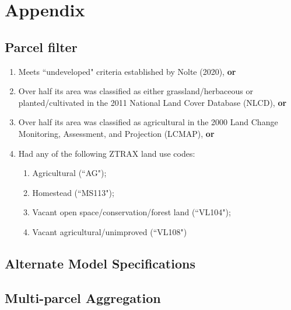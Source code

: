 \documentclass[12pt]{article}
\begin{document}
\newpage

\section{Appendix}


\subsection{Parcel filter}

\begin{enumerate}
    \item Meets ``undeveloped" criteria established by Nolte (2020), \textbf{or}
    \item Over half its area was classified as either grassland/herbaceous or planted/cultivated in the 2011 National Land Cover Database (NLCD), \textbf{or}
    \item Over half its area was classified as agricultural in the 2000 Land Change Monitoring, Assessment, and Projection (LCMAP), \textbf{or}
    \item Had any of the following ZTRAX land use codes:
    \begin{enumerate}
        \item Agricultural (``AG");
        \item Homestead (``MS113");
        \item Vacant open space/conservation/forest land (``VL104");
        \item Vacant agricultural/unimproved (``VL108")
    \end{enumerate}
\end{enumerate}

\subsection{Alternate Model Specifications}


\subsection{Multi-parcel Aggregation}



\newpage


\printbibliography
\end{document}
